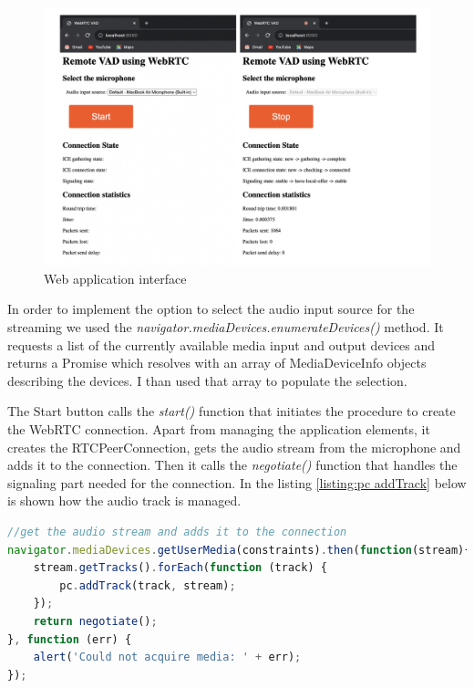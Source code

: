 \documentclass[../main.tex]{subfiles}
\begin{document}
\begin{figure}[ht]
    \centering
    \includegraphics[width=\textwidth]{images/Web interface.png}
    \caption{Web application interface}
    \label{fig:web interface}
\end{figure}

In order to implement the option to select the audio input source for the streaming we used the \textit{navigator.mediaDevices.enumerateDevices()} method. It requests a list of the currently available media input and output devices and returns a Promise which resolves with an array of MediaDeviceInfo objects describing the devices. I than used that array to populate the selection.

The Start button calls the \textit{start()} function that initiates the procedure to create the WebRTC connection. Apart from managing the application elements, it creates the RTCPeerConnection, gets the audio stream from the microphone and adds it to the connection. Then it calls the \textit{negotiate()} function that handles the signaling part needed for the connection.  In the listing \ref{listing:pc addTrack} below is shown how the audio track is managed.

\begin{lstlisting}[language=JavaScript, caption=Audio stream handling]
//get the audio stream and adds it to the connection
navigator.mediaDevices.getUserMedia(constraints).then(function(stream){
    stream.getTracks().forEach(function (track) {
        pc.addTrack(track, stream);
    });
    return negotiate();
}, function (err) {
    alert('Could not acquire media: ' + err);
}); 
\end{lstlisting}
\label{listing:pc addTrack}
\end{document}
